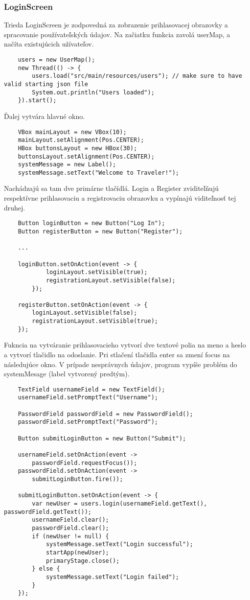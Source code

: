 \documentclass{article}
\begin{document}
\subsubsection{LoginScreen}
Trieda LoginScreen je zodpovedná za zobrazenie prihlasovacej obrazovky a spracovanie používateľských údajov.
Na začiatku funkcia zavolá userMap, a načíta existujúcich užívateľov.
\begin{verbatim}
    users = new UserMap();
    new Thread(() -> {
        users.load("src/main/resources/users"); // make sure to have valid starting json file
        System.out.println("Users loaded");
    }).start();
\end{verbatim}
Ďalej vytvára hlavné okno.
\begin{verbatim}
    VBox mainLayout = new VBox(10);
    mainLayout.setAlignment(Pos.CENTER);
    HBox buttonsLayout = new HBox(30);
    buttonsLayout.setAlignment(Pos.CENTER);
    systemMessage = new Label();
    systemMessage.setText("Welcome to Traveler!");
\end{verbatim}
Nachádzajú sa tam dve primárne tlačídlá. Login a Register zviditeľňujú respektívne prihlasovaciu a registrovaciu obrazovku a vypínajú viditeľnosť tej druhej.
\begin{verbatim}
    Button loginButton = new Button("Log In");
    Button registerButton = new Button("Register");

    ... 

    loginButton.setOnAction(event -> {
            loginLayout.setVisible(true);
            registrationLayout.setVisible(false);
        });

    registerButton.setOnAction(event -> {
        loginLayout.setVisible(false);
        registrationLayout.setVisible(true);
    });
\end{verbatim}
Fukncia na vytváranie prihlasovacieho vytvorí dve textové polia na meno a heslo a vytvorí tlačidlo na odoslanie. Pri stlačení tlačidla enter sa zmení focus na následujúce okno. V prípade nesprávnych údajov, program vypíše problém do systemMesage (label vytvorený predtým).
\begin{verbatim}
    TextField usernameField = new TextField();
    usernameField.setPromptText("Username");

    PasswordField passwordField = new PasswordField();
    passwordField.setPromptText("Password");

    Button submitLoginButton = new Button("Submit");

    usernameField.setOnAction(event ->     
        passwordField.requestFocus());
    passwordField.setOnAction(event -> 
        submitLoginButton.fire());

    submitLoginButton.setOnAction(event -> {
        var newUser = users.login(usernameField.getText(), passwordField.getText());
        usernameField.clear();
        passwordField.clear();
        if (newUser != null) {
            systemMessage.setText("Login successful");
            startApp(newUser);
            primaryStage.close();
        } else {
            systemMessage.setText("Login failed");
        }
    });
\end{verbatim}
\end{document}
